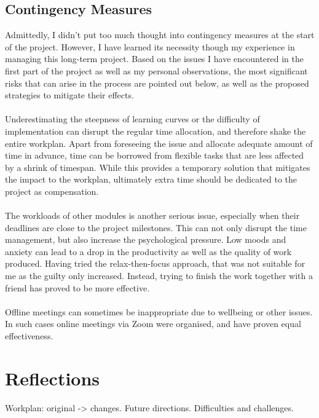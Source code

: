 \subsection{Contingency Measures}
Admittedly, I didn’t put too much thought into contingency measures at the start of the project. However, I have learned its necessity though my experience in managing this long-term project. Based on the issues I have encountered in the first part of the project as well as my personal observations, the most significant risks that can arise in the process are pointed out below, as well as the proposed strategies to mitigate their effects.
\\\\
Underestimating the steepness of learning curves or the difficulty of implementation can disrupt the regular time allocation, and therefore shake the entire workplan. Apart from foreseeing the issue and allocate adequate amount of time in advance, time can be borrowed from flexible tasks that are less affected by a shrink of timespan. While this provides a temporary solution that mitigates the impact to the workplan, ultimately extra time should be dedicated to the project as compensation.
\\\\
The workloads of other modules is another serious issue, especially when their deadlines are close to the project milestones. This can not only disrupt the time management, but also increase the psychological pressure. Low moods and anxiety can lead to a drop in the productivity as well as the quality of work produced. Having tried the relax-then-focus approach, that was not suitable for me as the guilty only increased. Instead, trying to finish the work together with a friend has proved to be more effective.
\\\\
Offline meetings can sometimes be inappropriate due to wellbeing or other issues. In such cases online meetings via Zoom were organised, and have proven equal effectiveness.


\section{Reflections}

Workplan: original -> changes.
Future directions.
Difficulties and challenges.

